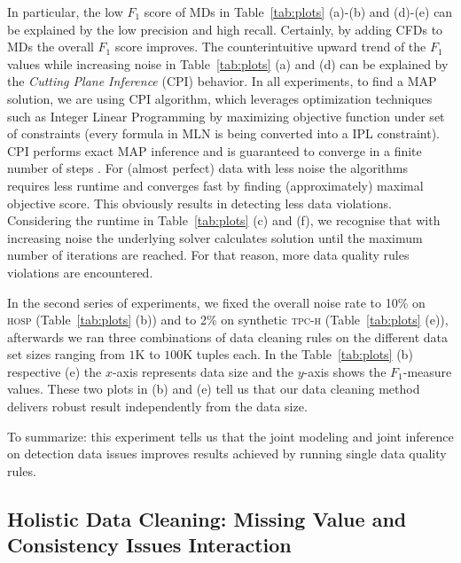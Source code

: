 In particular, the low $F_1$ score of MDs in Table~\ref{tab:plots} (a)-(b) and (d)-(e) can be explained by the low precision and high recall. Certainly, by adding CFDs to MDs the overall $F_1$ score improves.
The counterintuitive upward trend of the $F_1$ values while increasing noise in Table~\ref{tab:plots} (a) and (d) can be explained by the \textit{Cutting Plane Inference} (CPI) \cite{riedel08improving} behavior. In all experiments, to find a MAP solution, we are using CPI algorithm, which leverages optimization techniques such as Integer Linear Programming \cite{riedel08improving, NoessnerNS13} by maximizing objective function under set of constraints (every formula in MLN is being converted into a IPL constraint). CPI performs exact MAP inference and is guaranteed to converge in a finite number of steps \cite{riedel08improving}. %
For (almost perfect) data with less noise the algorithms requires less runtime and converges fast by finding (approximately) maximal objective score. This obviously results in detecting less data violations. Considering the runtime in Table~\ref{tab:plots} (c) and (f), we recognise that with increasing noise the underlying solver calculates solution until the maximum number of iterations are reached. For that reason, more data quality rules violations are encountered. 

In the second series of experiments, we fixed the overall noise rate to 10\% on \textsc{hosp} (Table~\ref{tab:plots} (b)) and to 2\% on synthetic \textsc{tpc-h} (Table~\ref{tab:plots} (e)), afterwards we ran three combinations of data cleaning rules on the different data set sizes ranging from $1$K to $100$K tuples each. In the Table~\ref{tab:plots} (b) respective (e) the $x$-axis represents data size and the $y$-axis shows the $F_1$-measure values. These two plots in (b) and (e) tell us that our data cleaning method delivers robust result independently from the data size. 

To summarize: this experiment tells us that the joint modeling and joint inference on detection data issues improves results achieved by running single data quality rules.%


\subsection{Holistic Data Cleaning: Missing Value and Consistency Issues Interaction}

